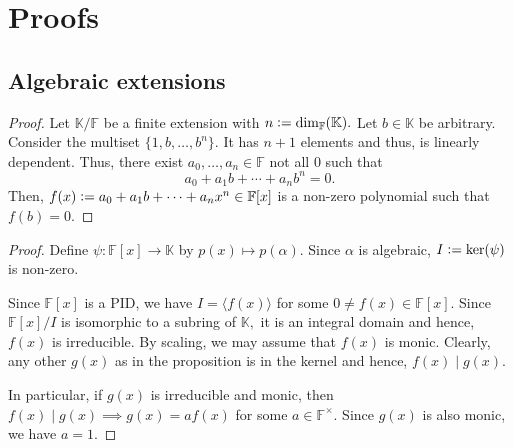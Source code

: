 \chapter{Proofs}
\section{Algebraic extensions}

\finextisalg*\label{prop:finextisalg2}
\begin{flushright}\hyperref[prop:finextisalg]{\upsym}\end{flushright}
\begin{proof}
    Let $\mathbb{K}/\mathbb{F}$ be a finite extension with $n \vcentcolon= \dim_{\mathbb{F}}(\mathbb{K}).$ Let $b \in \mathbb{K}$ be arbitrary. Consider the multiset $\{1, b, \ldots, b^{n}\}.$ It has $n + 1$ elements and thus, is linearly dependent. Thus, there exist $a_0, \ldots, a_{n} \in \mathbb{F}$ not all $0$ such that
    \begin{equation*} 
        a_0 + a_1b + \cdots + a_nb^n = 0.
    \end{equation*}
    Then, $f(x) \vcentcolon= a_0 + a_1b + \cdots + a_nx^n \in \mathbb{F}[x]$ is a non-zero polynomial such that $f(b) = 0.$
\end{proof}

\uniquemonicirred*\label{prop:uniquemonicirred2}
\begin{flushright}\hyperref[prop:uniquemonicirred]{\upsym}\end{flushright}
\begin{proof}
    Define $\psi : \mathbb{F}[x] \to \mathbb{K}$ by $p(x) \mapsto p(\alpha).$ Since $\alpha$ is algebraic, $I \vcentcolon= \ker(\psi)$ is non-zero.

    Since $\mathbb{F}[x]$ is a PID, we have $I = \langle f(x)\rangle$ for some $0 \neq f(x) \in \mathbb{F}[x].$ Since $\mathbb{F}[x]/I$ is isomorphic to a subring of $\mathbb{K},$ it is an integral domain and hence, $f(x)$ is irreducible. By scaling, we may assume that $f(x)$ is monic. Clearly, any other $g(x)$ as in the proposition is in the kernel and hence, $f(x) \mid g(x).$

    In particular, if $g(x)$ is irreducible and monic, then $f(x) \mid g(x) \implies g(x) = af(x)$ for some $a \in \mathbb{F}^\times.$ Since $g(x)$ is also monic, we have $a = 1.$
\end{proof}

